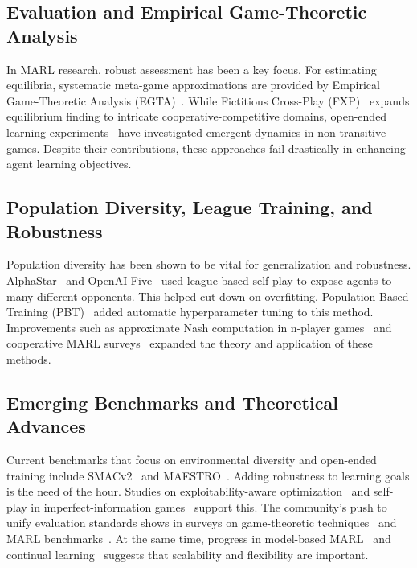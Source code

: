\documentclass[sigconf,anonymous]{aamas}
\begin{document}
\subsection{Evaluation and Empirical Game-Theoretic Analysis}

In MARL research, robust assessment has been a key focus. For estimating equilibria, systematic meta-game approximations are provided by Empirical Game-Theoretic Analysis (EGTA)~\cite{Wellman2006}. While Fictitious Cross-Play (FXP)~\cite{Xu2023} expands equilibrium finding to intricate cooperative-competitive domains, open-ended learning experiments~\cite{Balduzzi2019} have investigated emergent dynamics in non-transitive games. Despite their contributions, these approaches fail drastically in enhancing agent learning objectives.

\subsection{Population Diversity, League Training, and Robustness}

Population diversity has been shown to be vital for generalization and robustness. AlphaStar~\cite{Vinyals2019} and OpenAI Five~\cite{OpenAI2019} used league-based self-play to expose agents to many different opponents. This helped cut down on overfitting. Population-Based Training (PBT)~\cite{Jaderberg2017} added automatic hyperparameter tuning to this method. Improvements such as approximate Nash computation in n-player games~\cite{Xu2022} and cooperative MARL surveys~\cite{Panait2005} expanded the theory and application of these methods.

\subsection{Emerging Benchmarks and Theoretical Advances}

Current benchmarks that focus on environmental diversity and open-ended training include SMACv2~\cite{Ellis2023} and MAESTRO~\cite{Samvelyan2023}. Adding robustness to learning goals is the need of the hour. Studies on exploitability-aware optimization~\cite{Deng2024} and self-play in imperfect-information games~\cite{Sokota2024} support this. The community's push to unify evaluation standards shows in surveys on game-theoretic techniques~\cite{Wang2024} and MARL benchmarks~\cite{Cui2023}. At the same time, progress in model-based MARL~\cite{Zhang2023ModelBased} and continual learning~\cite{Zhao2023} suggests that scalability and flexibility are important.
\end{document}
